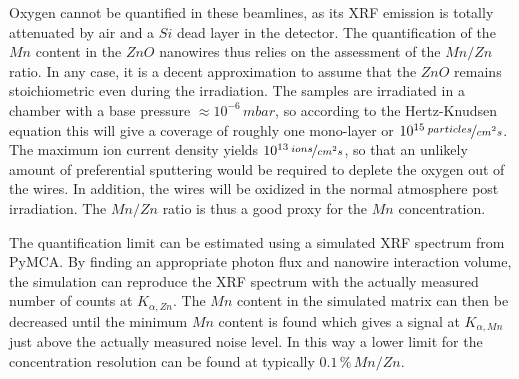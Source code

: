 Oxygen cannot be quantified in these beamlines, as its XRF emission is totally attenuated by air and a $Si$ dead layer in the detector. The quantification of the $Mn$ content in the $ZnO$ nanowires thus relies on the assessment of the $Mn/Zn$ ratio. In any case, it is a decent approximation to assume that the $ZnO$ remains stoichiometric even during the irradiation. The samples are irradiated in a chamber with a base pressure $\approx 10^{-6}\,mbar$, so according to the Hertz-Knudsen equation this will give a coverage of roughly one mono-layer or $10^{15}\,\nicefrac{particles}{cm^2s}$. The maximum ion current density yields $10^{13}\,\nicefrac{ions}{cm^2s}$, so that an unlikely amount of preferential sputtering would be required to deplete the oxygen out of the wires. In addition, the wires will be oxidized in the normal atmosphere post irradiation. The $Mn/Zn$ ratio is thus a good proxy for the $Mn$ concentration.

The quantification limit can be estimated using a simulated XRF spectrum from PyMCA. By finding an appropriate photon flux and nanowire interaction volume, the simulation can reproduce the XRF spectrum with the actually measured number of counts at $K_{\alpha,Zn}$. The $Mn$ content in the simulated matrix can then be decreased until the minimum $Mn$ content is found which gives a signal at $K_{\alpha,Mn}$ just above the actually measured noise level. In this way a lower limit for the concentration resolution can be found at typically $0.1\,\%\,Mn/Zn$.



